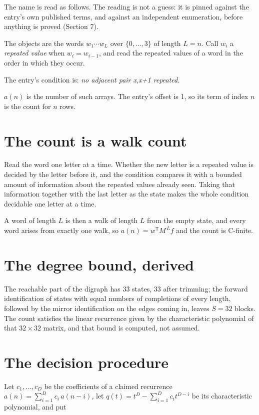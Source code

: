 \documentclass[11pt]{article}
\theoremstyle{definition}
\begin{document}
The name is read as follows. The reading is not a guess: it is pinned against the entry's own published terms, and against an independent enumeration, before anything is proved (Section 7).

The objects are the words $w_1\cdots w_L$ over $\{0,\dots,3\}$ of length $L = n$. Call $w_i$ a {\itshape repeated value} when $w_i = w_{i-1}$, and read the repeated values of a word in the order in which they occur.

The entry's condition is: {\itshape no adjacent pair x,x+1 repeated}.

$a(n)$ is the number of such arrays. The entry's offset is 1, so its term of index $n$ is the count for $n$ rows.

\section{The count is a walk count}

Read the word one letter at a time. Whether the new letter is a repeated value is decided by the letter before it, and the condition compares it with a bounded amount of information about the repeated values already seen. Taking that information together with the last letter as the state makes the whole condition decidable one letter at a time.

A word of length $L$ is then a walk of length $L$ from the empty state, and every word arises from exactly one walk, so $a(n) = w^{\mathsf T}M^{\,L}f$ and the count is C-finite.

\section{The degree bound, derived}

The reachable part of the digraph has $33$ states, $33$ after trimming; the forward identification of states with equal numbers of completions of every length, followed by the mirror identification on the edges coming in, leaves $S = 32$ blocks. The count satisfies the linear recurrence given by the characteristic polynomial of that $32\times32$ matrix, and that bound is computed, not assumed.

\section{The decision procedure}

Let $c_1,\dots,c_D$ be the coefficients of a claimed recurrence $a(n) = \sum_{i=1}^{D} c_i\,a(n-i)$, let $q(t) = t^{D} - \sum_{i=1}^{D} c_i t^{D-i}$ be its characteristic polynomial, and put
\end{document}
